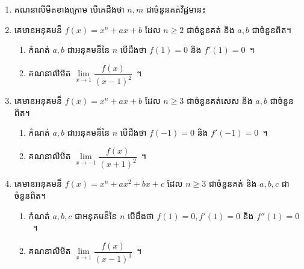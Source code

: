 \documentclass[a5paper,leqno,fleqn]{book}
\begin{document}
\begin{enumerate}
	\item គណនាលីមីតខាងក្រោម បើគេដឹងថា $ n,m $ ជាចំនួនគត់វិជ្ជមាន៖
	\begin{enumerate}
	\end{enumerate}
	\item គេមានអនុគមន៏ $ f(x)=x^n+ax+b $ ដែល $ n\geq 2 $ ជាចំនួនគត់ និង $ a,b $ ជាចំនួនពិត។
	\begin{enumerate}
		\item កំណត់ $ a,b $ ជាអនុគមន៏នៃ $ n $ បើដឹងថា $ f(1)=0 $ និង $ f'(1)=0 $~។
		\item គណនាលីមីត $ \lim\limits_{x\to 1}\dfrac{f(x)}{(x-1)^2} $~។
	\end{enumerate}
	\item គេមានអនុគមន៏ $ f(x)=x^n+ax+b $ ដែល $ n\geq 3 $ ជាចំនួនគត់សេស និង $ a,b $ ជាចំនួនពិត។
	\begin{enumerate}
		\item កំណត់ $ a,b $ ជាអនុគមន៏នៃ $ n $ បើដឹងថា $ f(-1)=0 $ និង $ f'(-1)=0 $~។
		\item គណនាលីមីត $ \lim\limits_{x\to -1}\dfrac{f(x)}{(x+1)^2} $~។
	\end{enumerate}
	\item គេមានអនុគមន៏ $ f(x)=x^n+ax^2+bx+c $ ដែល $ n\geq 3 $ ជាចំនួនគត់ និង $ a,b,c $ ជាចំនួនពិត។
	\begin{enumerate}
		\item កំណត់ $ a,b,c $ ជាអនុគមន៏នៃ $ n $ បើដឹងថា $ f(1)=0,f'(1)=0 $ និង $ f''(1)=0 $~។
		\item គណនាលីមីត $ \lim\limits_{x\to 1}\dfrac{f(x)}{(x-1)^3} $~។

\end{enumerate}
\end{enumerate}
\end{document}
